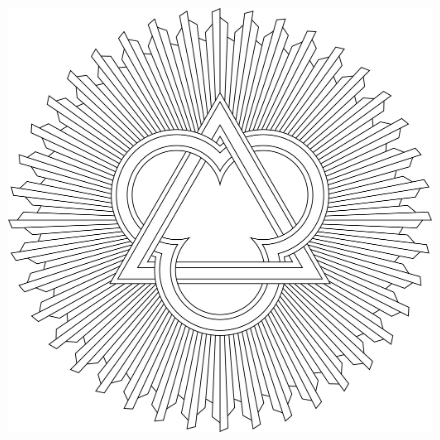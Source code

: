 \documentclass[11pt]{amsbook}
\begin{document}
    \begin{figure}[b]
        \includegraphics[scale=.18]{mhtlogo.png}
        \centering
        \vspace{1in}
    \end{figure}
\end{document}
